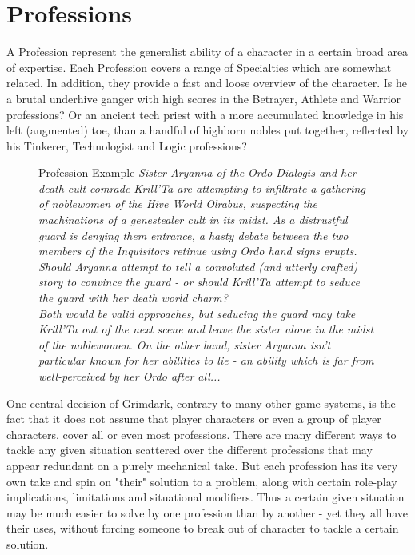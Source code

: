 \section{Professions} %
\label{sec:professions}
A Profession represent the generalist ability of a character in a certain broad area of expertise.
Each Profession covers a range of Specialties which are somewhat related.
In addition, they provide a fast and loose overview of the character.
Is he a brutal underhive ganger with high scores in the Betrayer, Athlete and Warrior professions?
Or an ancient tech priest with a more accumulated knowledge in his left (augmented) toe, than a handful of highborn nobles put together, reflected by his  Tinkerer, Technologist and Logic professions?
\begin{figure}[ht]
	\begin{DndSidebar}{Profession Example}
	\textit{Sister Aryanna of the Ordo Dialogis and her death-cult comrade Krill'Ta are attempting to infiltrate a gathering of noblewomen of the Hive World Olrabus, suspecting the machinations of a genestealer cult in its midst. As a distrustful guard is denying them entrance, a hasty debate between the two members of the Inquisitors retinue using Ordo hand signs erupts. Should Aryanna attempt to tell a convoluted (and utterly crafted) story to convince the guard - or should Krill'Ta attempt to seduce the guard with her death world charm?\\
	Both would be valid approaches, but seducing the guard may take Krill'Ta out of the next scene and leave the sister alone in the midst of the noblewomen. On the other hand, sister Aryanna isn't particular known for her abilities to lie - an ability which is far from well-perceived by her Ordo after all...\\}
	\end{DndSidebar}
\end{figure}

One central decision of Grimdark, contrary to many other game systems, is the fact that it does not assume that player characters or even a group of player characters, cover all or even most professions. 
There are many different ways to tackle any given situation scattered over the different professions that may appear redundant on a purely mechanical take.
But each profession has its very own take and spin on "their" solution to a problem, along with certain role-play implications, limitations and situational modifiers.
Thus a certain given situation may be much easier to solve by one profession than by another - yet they all have their uses, without forcing someone to break out of character to tackle a certain solution.

